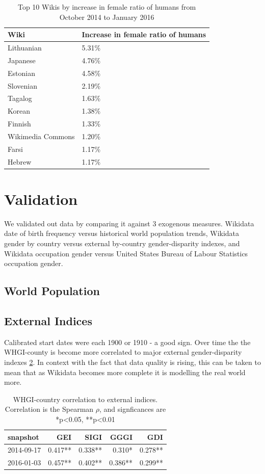 \documentclass[letterpaper]{article}
\begin{document}
\begin{table}
\caption{Top 10 Wikis by increase in female ratio of humans from October 2014 to January 2016}
\label{table:top10}
\begin{tabular}{p{2cm}p{2cm}}
\toprule
{Wiki} &     Increase in female ratio of humans  \\
\midrule
Lithuanian      & 5.31\% \\
Japanese     & 4.76\% \\
Estonian      & 4.58\% \\
Slovenian      & 2.19\% \\
Tagalog      & 1.63\% \\
Korean      & 1.38\% \\
Finnish      & 1.33\% \\
Wikimedia Commons & 1.20\% \\
Farsi      & 1.17\% \\
Hebrew      & 1.17\% \\
\bottomrule
\end{tabular}


\end{table}

\section{Validation}
We validated out data by comparing it against 3 exogenous measures. Wikidata date of birth frequency versus historical world population trends, Wikidata gender by country  versus external by-country gender-disparity indexes, and Wikidata occupation gender versus United States Bureau of Labour Statistics occupation gender.

\subsection{World Population}

\subsection{External Indices}
Calibrated start dates were each 1900 or 1910 - a good sign. Over time the the WHGI-county is become more correlated to major external gender-disparity indexes \ref{table:scores}. In context with the fact that data quality is rising, this can be taken to mean that as Wikidata becomes more complete it is modelling the real world more. 

 \begin{table}
\caption{WHGI-country correlation to external indices. Correlation is the Spearman $\rho$, and signficances are *p<0.05, **p<0.01}
\label{table:scores}
\begin{tabular}{lrrrr}
\toprule
snapshot &  GEI &  SIGI &  GGGI &  GDI  \\
\midrule
2014-09-17 &  0.417** &       0.338** &          0.310* &         0.278**  \\
2016-01-03 &  0.457** &       0.402** &          0.386** &         0.299**  \\
\bottomrule
\end{tabular}
\end{table}
\end{document}

